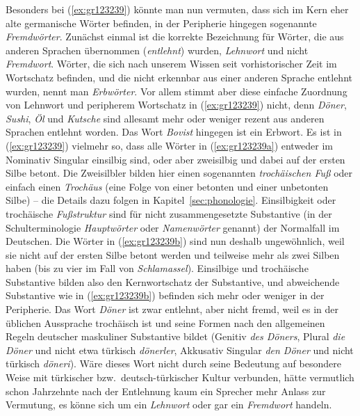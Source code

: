 Besonders bei (\ref{ex:gr123239}) könnte man nun vermuten, dass sich im Kern eher alte germanische Wörter befinden, in der Peripherie hingegen sogenannte \textit{Fremdwörter}.
Zunächst einmal ist die korrekte Bezeichnung für Wörter, die aus anderen Sprachen übernommen (\textit{entlehnt}) wurden, \textit{Lehnwort} und nicht \textit{Fremdwort}.
Wörter, die sich nach unserem Wissen seit vorhistorischer Zeit im Wortschatz befinden, und die nicht erkennbar aus einer anderen Sprache entlehnt wurden, nennt man \textit{Erbwörter}.
Vor allem stimmt aber diese einfache Zuordnung von Lehnwort und peripherem Wortschatz in (\ref{ex:gr123239}) nicht, denn \textit{Döner}, \textit{Sushi}, \textit{Öl} und \textit{Kutsche} sind allesamt mehr oder weniger rezent aus anderen Sprachen entlehnt worden.
Das Wort \textit{Bovist} hingegen ist ein Erbwort.
Es ist in (\ref{ex:gr123239}) vielmehr so, dass alle Wörter in (\ref{ex:gr123239a}) entweder im Nominativ Singular einsilbig sind, oder aber zweisilbig und dabei auf der ersten Silbe betont.
Die Zweisilbler bilden hier einen sogenannten \textit{trochäischen Fuß} oder einfach einen \textit{Trochäus} (eine Folge von einer betonten und einer unbetonten Silbe) -- die Details dazu folgen in Kapitel~\ref{sec:phonologie}.
Einsilbigkeit oder trochäische \textit{Fußstruktur} sind für nicht zusammengesetzte Substantive (in der Schulterminologie \textit{Hauptwörter} oder \textit{Namenwörter} genannt) der Normalfall im Deutschen.
Die Wörter in (\ref{ex:gr123239b}) sind nun deshalb ungewöhnlich, weil sie nicht auf der ersten Silbe betont werden und teilweise mehr als zwei Silben haben (bis zu vier im Fall von \textit{Schlamassel}).
Einsilbige und trochäische Substantive bilden also den Kernwortschatz der Substantive, und abweichende Substantive wie in (\ref{ex:gr123239b}) befinden sich mehr oder weniger in der Peripherie.
Das Wort \textit{Döner} ist zwar entlehnt, aber nicht fremd, weil es in der üblichen Aussprache trochäisch ist und seine Formen nach den allgemeinen Regeln deutscher maskuliner Substantive bildet (Genitiv \textit{des Döners}, Plural \textit{die Döner} und nicht etwa türkisch \textit{dönerler}, Akkusativ Singular \textit{den Döner} und nicht türkisch \textit{döneri}).
Wäre dieses Wort nicht durch seine Bedeutung auf besondere Weise mit türkischer bzw.\ deutsch-türkischer Kultur verbunden, hätte vermutlich schon Jahrzehnte nach der Entlehnung kaum ein Sprecher mehr Anlass zur Vermutung, es könne sich um ein \textit{Lehnwort} oder gar ein \textit{Fremdwort} handeln.


